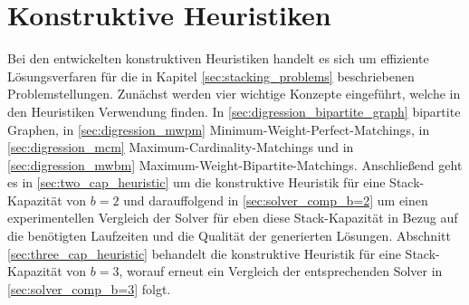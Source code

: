 





\pagebreak

\section{Konstruktive Heuristiken}
\label{sec:constructive_heuristics}

Bei den entwickelten konstruktiven Heuristiken handelt es sich um effiziente Lösungsverfaren für die in Kapitel \ref{sec:stacking_problems}
beschriebenen Problemstellungen. Zunächst werden vier wichtige Konzepte eingeführt, welche in den Heuristiken Verwendung finden.
In \ref{sec:digression_bipartite_graph} bipartite Graphen, in \ref{sec:digression_mwpm} Minimum-Weight-Perfect-Matchings, in \ref{sec:digression_mcm} Maximum-Cardinality-Matchings und in \ref{sec:digression_mwbm} Maximum-Weight-Bipartite-Matchings. Anschließend geht es in \ref{sec:two_cap_heuristic} um die konstruktive Heuristik
für eine Stack-Kapazität von $b=2$ und darauffolgend in \ref{sec:solver_comp_b=2} um einen experimentellen Vergleich der Solver für
eben diese Stack-Kapazität in Bezug auf die benötigten Laufzeiten und die Qualität der generierten Lösungen.
Abschnitt \ref{sec:three_cap_heuristic} behandelt die konstruktive Heuristik für eine Stack-Kapazität von $b=3$, worauf erneut ein Vergleich der entsprechenden Solver in \ref{sec:solver_comp_b=3} folgt.

